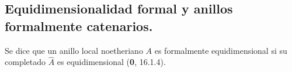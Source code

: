 \subsection{Equidimensionalidad formal y anillos formalmente catenarios.}
\label{subsection:IV.7.1-fr}

\begin{definition}[7.1.1]
\label{IV.2.s7.1.1-fr}
Se dice que un anillo local noetheriano $A$ es
formalmente equidimensional si su completado
$\widehat A$ es equidimensional \textup{(\textbf{0}, 16.1.4)}.
\end{definition}
